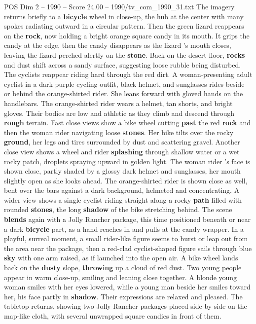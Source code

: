 \begin{textsample}{POS Dim 2 – 1990 – Score 24.00 – 1990/tv\_com\_1990\_31.txt}
The imagery returns briefly to a \textbf{bicycle} wheel in close-up, the hub at the center with many spokes radiating outward in a circular pattern.
Then the green lizard reappears on the \textbf{rock}, now holding a bright orange square candy in its mouth.
It grips the candy at the edge, then the candy disappears as the lizard ’s mouth closes, leaving the lizard perched alertly on the \textbf{stone}.
Back on the desert floor, \textbf{rocks} and dust shift across a sandy surface, suggesting loose rubble being disturbed.
The cyclists reappear riding hard through the red dirt.
A woman-presenting adult cyclist in a dark purple cycling outfit, black helmet, and sunglasses rides beside or behind the orange-shirted rider.
She leans forward with gloved hands on the handlebars.
The orange-shirted rider wears a helmet, tan shorts, and bright gloves.
Their bodies are low and athletic as they climb and descend through \textbf{rough} terrain.
Fast close views show a bike wheel cutting \textbf{past} the red \textbf{rock} and then the woman rider navigating loose \textbf{stones}.
Her bike tilts over the rocky \textbf{ground}, her legs and tires surrounded by dust and scattering gravel.
Another close view shows a wheel and rider \textbf{splashing} through shallow water or a wet rocky patch, droplets spraying upward in golden light.
The woman rider ’s face is shown close, partly shaded by a glossy dark helmet and sunglasses, her mouth slightly open as she looks ahead.
The orange-shirted rider is shown close as well, bent over the bars against a dark background, helmeted and concentrating.
A wider view shows a single cyclist riding straight along a rocky \textbf{path} filled with rounded \textbf{stones}, the long \textbf{shadow} of the bike stretching behind.
The scene \textbf{blends} again with a Jolly Rancher package, this time positioned beneath or near a dark \textbf{bicycle} part, as a hand reaches in and pulls at the candy wrapper.
In a playful, surreal moment, a small rider-like figure seems to burst or leap out from the area near the package, then a red-clad cyclist-shaped figure sails through blue \textbf{sky} with one arm raised, as if launched into the open air.
A bike wheel lands back on the \textbf{dusty} slope, \textbf{throwing} up a cloud of red dust.
Two young people appear in warm close-up, smiling and leaning close together.
A blonde young woman smiles with her eyes lowered, while a young man beside her smiles toward her, his face partly in \textbf{shadow}.
Their expressions are relaxed and pleased.
The tabletop returns, showing two Jolly Rancher packages placed side by side on the map-like cloth, with several unwrapped square candies in front of them.

\end{textsample}
